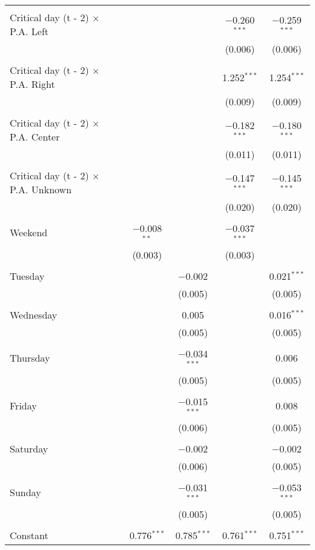 \documentclass[
]{article}
\begin{document}
\begin{table}[!htbp]
{\begin{tabular}{@{\extracolsep{5pt}}lcccc}
  & & & & \\ 
 Critical day (t - 2) $\times$ P.A. Left &  &  & $-$0.260$^{***}$ & $-$0.259$^{***}$ \\ 
  &  &  & (0.006) & (0.006) \\ 
  & & & & \\ 
 Critical day (t - 2) $\times$ P.A. Right &  &  & 1.252$^{***}$ & 1.254$^{***}$ \\ 
  &  &  & (0.009) & (0.009) \\ 
  & & & & \\ 
 Critical day (t - 2) $\times$ P.A. Center &  &  & $-$0.182$^{***}$ & $-$0.180$^{***}$ \\ 
  &  &  & (0.011) & (0.011) \\ 
  & & & & \\ 
 Critical day (t - 2) $\times$ P.A. Unknown &  &  & $-$0.147$^{***}$ & $-$0.145$^{***}$ \\ 
  &  &  & (0.020) & (0.020) \\ 
  & & & & \\ 
 Weekend & $-$0.008$^{**}$ &  & $-$0.037$^{***}$ &  \\ 
  & (0.003) &  & (0.003) &  \\ 
  & & & & \\ 
 Tuesday &  & $-$0.002 &  & 0.021$^{***}$ \\ 
  &  & (0.005) &  & (0.005) \\ 
  & & & & \\ 
 Wednesday &  & 0.005 &  & 0.016$^{***}$ \\ 
  &  & (0.005) &  & (0.005) \\ 
  & & & & \\ 
 Thursday &  & $-$0.034$^{***}$ &  & 0.006 \\ 
  &  & (0.005) &  & (0.005) \\ 
  & & & & \\ 
 Friday &  & $-$0.015$^{***}$ &  & 0.008 \\ 
  &  & (0.006) &  & (0.005) \\ 
  & & & & \\ 
 Saturday &  & $-$0.002 &  & $-$0.002 \\ 
  &  & (0.006) &  & (0.005) \\ 
  & & & & \\ 
 Sunday &  & $-$0.031$^{***}$ &  & $-$0.053$^{***}$ \\ 
  &  & (0.005) &  & (0.005) \\ 
  & & & & \\ 
 Constant & 0.776$^{***}$ & 0.785$^{***}$ & 0.761$^{***}$ & 0.751$^{***}$ \\ 

\end{tabular}}
\end{table}
\end{document}
